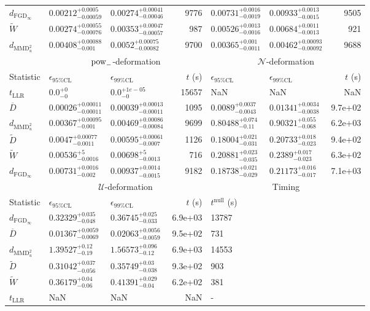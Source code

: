 \begin{tabular}{l|llr|llr}
	$d_{\mathrm{FGD}_{\infty}}$ & $0.00212_{-0.00059}^{+0.0005}$ & $0.00274_{-0.00046}^{+0.00041}$ & 9776 & $0.00731_{-0.0019}^{+0.0016}$ & $0.00933_{-0.0015}^{+0.0013}$ & 9505 \\
	$\widetilde{W}$ & $0.00274_{-0.00076}^{+0.00055}$ & $0.00353_{-0.00057}^{+0.00047}$ & 987 & $0.00526_{-0.0016}^{+0.0013}$ & $0.00684_{-0.0013}^{+0.0011}$ & 921 \\
	$d_{\mathrm{MMD}^{2}_{u}}$ & $0.00408_{-0.001}^{+0.00088}$ & $0.0052_{-0.00082}^{+0.00075}$ & 9700 & $0.00365_{-0.0011}^{+0.001}$ & $0.00462_{-0.00092}^{+0.00093}$ & 9688 \\
	\toprule
	\multicolumn{1}{c}{} & \multicolumn{3}{c}{$\rm{pow}_{-}$-deformation} & \multicolumn{3}{c}{$\mathcal{N}$-deformation} \\
	Statistic & $\epsilon_{95\%\mathrm{CL}}$ & $\epsilon_{99\%\mathrm{CL}}$ & $t$ (s) & $\epsilon_{95\%\mathrm{CL}}$ & $\epsilon_{99\%\mathrm{CL}}$ & $t$ (s) \\
	\midrule
	$t_{\mathrm{LLR}}$ & $0.0_{-0}^{+0}$ & $0.0_{-0}^{+1e-05}$ & 15657 & NaN & NaN & NaN \\
	$\overline{D}$ & $0.00026_{-0.00011}^{+0.00011}$ & $0.00039_{-0.00011}^{+0.00013}$ & 1095 & $0.0089_{-0.0043}^{+0.0037}$ & $0.01341_{-0.0038}^{+0.0034}$ & 9.7e+02 \\
	$d_{\mathrm{MMD}^{2}_{u}}$ & $0.00367_{-0.001}^{+0.00095}$ & $0.00469_{-0.00084}^{+0.00086}$ & 9699 & $0.80488_{-0.11}^{+0.074}$ & $0.90321_{-0.068}^{+0.055}$ & 6.2e+03 \\
	$\widetilde{D}$ & $0.0047_{-0.0011}^{+0.00077}$ & $0.00595_{-0.0007}^{+0.00061}$ & 1126 & $0.18004_{-0.031}^{+0.021}$ & $0.20733_{-0.023}^{+0.018}$ & 9.4e+02 \\
	$\widetilde{W}$ & $0.00536_{-0.0016}^{+5}$ & $0.00698_{-0.0013}^{+5}$ & 716 & $0.20881_{-0.035}^{+0.023}$ & $0.2389_{-0.023}^{+0.017}$ & 6.3e+02 \\
	$d_{\mathrm{FGD}_{\infty}}$ & $0.00731_{-0.002}^{+0.0016}$ & $0.00937_{-0.0015}^{+0.0014}$ & 9182 & $0.18738_{-0.029}^{+0.021}$ & $0.21173_{-0.017}^{+0.016}$ & 7.1e+03 \\
	\toprule
	\multicolumn{1}{c}{} & \multicolumn{3}{c}{$\mathcal{U}$-deformation} & \multicolumn{3}{c}{Timing} \\
	Statistic & $\epsilon_{95\%\mathrm{CL}}$ & $\epsilon_{99\%\mathrm{CL}}$ & $t$ (s) & $t^{\mathrm{null}}$ (s) \\
	\midrule
	$d_{\mathrm{FGD}_{\infty}}$ & $0.32329_{-0.048}^{+0.035}$ & $0.36745_{-0.033}^{+0.025}$ & 6.9e+03 & 13787 \\
	$\overline{D}$ & $0.01367_{-0.0069}^{+0.0059}$ & $0.02063_{-0.0059}^{+0.0056}$ & 9.5e+02 & 731 \\
	$d_{\mathrm{MMD}^{2}_{u}}$ & $1.39527_{-0.19}^{+0.12}$ & $1.56573_{-0.12}^{+0.096}$ & 6.9e+03 & 14553 \\
	$\widetilde{D}$ & $0.31042_{-0.056}^{+0.037}$ & $0.35749_{-0.038}^{+0.03}$ & 9.3e+02 & 903 \\
	$\widetilde{W}$ & $0.36179_{-0.06}^{+0.04}$ & $0.41391_{-0.04}^{+0.029}$ & 6.2e+02 & 381 \\
	$t_{\mathrm{LLR}}$ & NaN & NaN & NaN & - \\
	\bottomrule
\end{tabular}